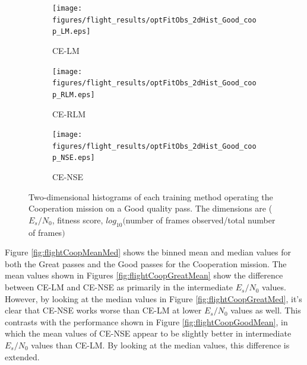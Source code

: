 \begin{figure}[ht]
\begin{subfigure}{0.30\linewidth}
	\centering
	\texttt{[image: figures/flight\_results/optFitObs\_2dHist\_Good\_coop\_LM.eps]}
	\caption{CE-LM}
	\label{fig:coopGood2dHist_LM}
\end{subfigure}\hfill%
\begin{subfigure}{0.30\linewidth}
	\centering
	\texttt{[image: figures/flight\_results/optFitObs\_2dHist\_Good\_coop\_RLM.eps]}
	\caption{CE-RLM}
	\label{fig:coopGood2dHist_RLM}
\end{subfigure}\hfill%
\begin{subfigure}{0.30\linewidth}
	\centering
	\texttt{[image: figures/flight\_results/optFitObs\_2dHist\_Good\_coop\_NSE.eps]}
	\caption{CE-NSE}
	\label{fig:coopGood2dHist_NSE}
\end{subfigure}
\caption{Two-dimensional histograms of each training method operating the Cooperation mission on a Good quality pass. The dimensions are ($E_s/N_0$, fitness score, $log_10($number of frames observed/total number of frames$)$} \label{fig:coop_good_2dhist}
\end{figure}

\FloatBarrier
\par Figure \ref{fig:flightCoopMeanMed} shows the binned mean and median values for both the Great passes and the Good passes for the Cooperation mission. The mean values shown in Figures \ref{fig:flightCoopGreatMean} show the difference between CE-LM and CE-NSE as primarily in the intermediate $E_s/N_0$ values. However, by looking at the median values in Figure \ref{fig:flightCoopGreatMed}, it's clear that CE-NSE works worse than CE-LM at lower $E_s/N_0$ values as well. This contrasts with the performance shown in Figure \ref{fig:flightCoopGoodMean}, in which the mean values of CE-NSE appear to  be slightly better in intermediate $E_s/N_0$ values than CE-LM. By looking at the median values, this difference is extended. 

